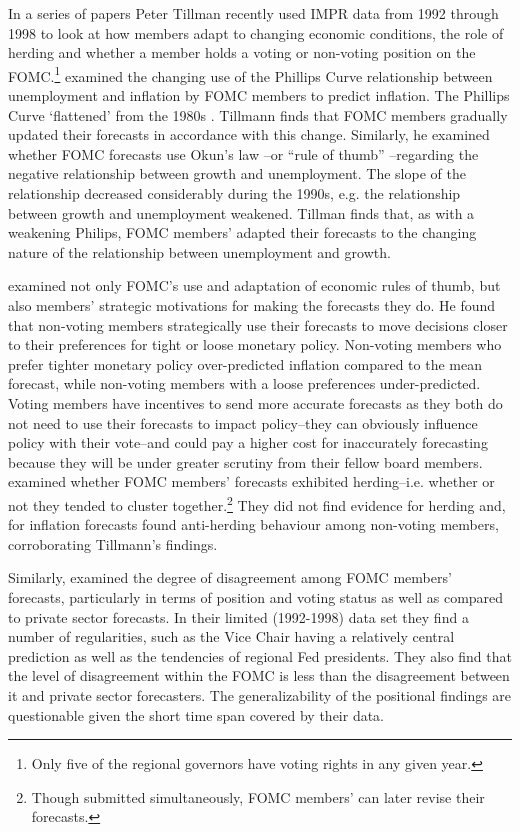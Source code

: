 \documentclass[a4paper]{article}\usepackage[]{graphicx}\usepackage[]{color}
\begin{document}
In a series of papers Peter Tillman recently used IMPR data from 1992 through 1998 to look at how members adapt to changing economic conditions, the role of herding and whether a member holds a voting or non-voting position on the FOMC.\footnote{Only five of the regional governors have voting rights in any given year.} \cite{Tillmann2010Philips} examined the changing use of the Phillips Curve relationship between unemployment and inflation by FOMC members to predict inflation. The Phillips Curve `flattened' from the 1980s \citep{Atkeson2001}. Tillmann finds that FOMC members gradually updated their forecasts in accordance with this change. Similarly, he examined whether FOMC forecasts use Okun's law \citeyearpar{Okun1962}--or ``rule of thumb'' \citep{KnotekII2007}--regarding the negative relationship between growth and unemployment. The slope of the relationship decreased considerably during the 1990s, e.g. the relationship between growth and unemployment weakened. Tillman finds that, as with a weakening Philips, FOMC members' adapted their forecasts to the changing nature of the relationship between unemployment and growth. 

\cite{Tillmann2011} examined not only FOMC's use and adaptation of economic rules of thumb, but also members' strategic motivations for making the forecasts they do. He found that non-voting members strategically use their forecasts to move decisions closer to their preferences for tight or loose monetary policy. Non-voting members who prefer tighter monetary policy over-predicted inflation compared to the mean forecast, while non-voting members with a loose preferences under-predicted. Voting members have incentives to send more accurate forecasts as they both do not need to use their forecasts to impact policy--they can obviously influence policy with their vote--and could pay a higher cost for inaccurately forecasting because they will be under greater scrutiny from their fellow board members. \cite{Rulke2011} examined whether FOMC members' forecasts exhibited herding--i.e. whether or not they tended to cluster together.\footnote{Though submitted simultaneously, FOMC members' can later revise their forecasts.} They did not find evidence for herding and, for inflation forecasts found anti-herding behaviour among non-voting members, corroborating Tillmann's \citeyearpar{Tillmann2011} findings. 

Similarly, \cite{Banternghansa2009} examined the degree of disagreement among FOMC members' forecasts, particularly in terms of position and voting status as well as compared to private sector forecasts. In their limited (1992-1998) data set they find a number of regularities, such as the Vice Chair having a relatively central prediction as well as the tendencies of regional Fed presidents. They also find that the level of disagreement within the FOMC is less than the disagreement between it and private sector forecasters. The generalizability of the positional findings are questionable given the short time span covered by their data. 
\end{document}
